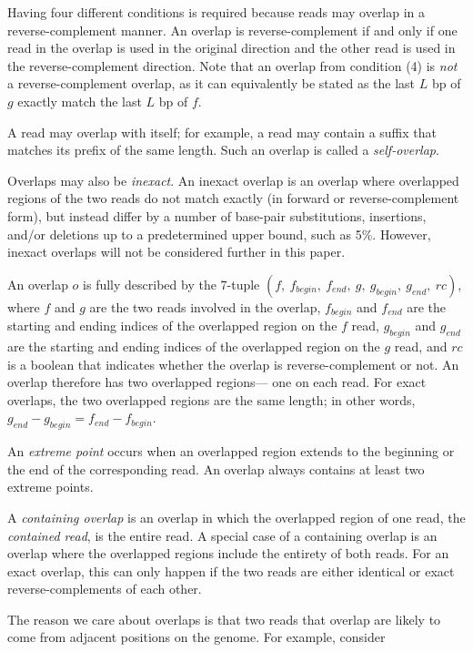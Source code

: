 \documentclass[10pt]{article}
\newcommand{\LengthVar}{L}
\begin{document}
Having four different conditions is required because reads may overlap in a
reverse-complement manner.  An overlap is reverse-complement if and only if one
read in the overlap is used in the original direction and the other read is used
in the reverse-complement direction.  Note that an overlap from condition (4) is
{\it not} a reverse-complement overlap, as it can equivalently be stated as the
last $\LengthVar$ bp of $g$ exactly match the last $\LengthVar$ bp of $f$.

A read may overlap with itself; for example, a read may contain a suffix that
matches its prefix of the same length.  Such an overlap is called a {\it
self-overlap}.

Overlaps may also be {\it inexact}.  An inexact overlap is an overlap where
overlapped regions of the two reads do not match exactly (in forward or
reverse-complement form), but instead differ by a number of base-pair
substitutions, insertions, and/or deletions up to a predetermined upper bound,
such as 5\%.  However, inexact overlaps will not be considered further in this
paper.

An overlap $o$ is fully described by the 7-tuple $(f,\ f_{begin},\ f_{end},\ g,
\ g_{begin},\ g_{end},\ rc)$, where $f$ and $g$ are the two reads involved in the
overlap, $f_{begin}$ and $f_{end}$ are the starting and ending indices of the
overlapped region on the $f$ read, $g_{begin}$ and $g_{end}$ are the starting
and ending indices of the overlapped region on the $g$ read, and $rc$ is a
boolean that indicates whether the overlap is reverse-complement or not.  An
overlap therefore has two overlapped regions--- one on each read.  For exact
overlaps, the two overlapped regions are the same length; in other words,
$g_{end} - g_{begin} = f_{end} - f_{begin}$.

An {\it extreme point} occurs when an overlapped region extends to the beginning
or the end of the corresponding read.  An overlap always contains at least two
extreme points.

A {\it containing overlap} is an overlap in which the overlapped region of one
read, the {\it contained read}, is the entire read.  A special case of a
containing overlap is an overlap where the overlapped regions include the
entirety of both reads.  For an exact overlap, this can only happen if the two
reads are either identical or exact reverse-complements of each other.

The reason we care about overlaps is that two reads that overlap are likely to
come from adjacent positions on the genome.  For example, consider
\end{document}
